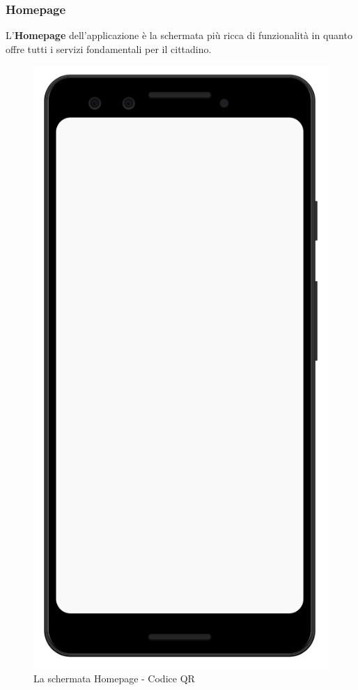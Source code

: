 \documentclass[12pt,a4paper,twoside,openright,titlepage]{book}
\begin{document}
\subsubsection{Homepage}
L'\textbf{Homepage} dell'applicazione è la schermata più ricca di funzionalità in quanto offre tutti i servizi fondamentali per il cittadino.\newline
\begin{figure}[H]
\centering
\includegraphics[scale = 0.2]{mobile}
\caption{La schermata Homepage - Codice QR}
\end{figure}
\end{document}

